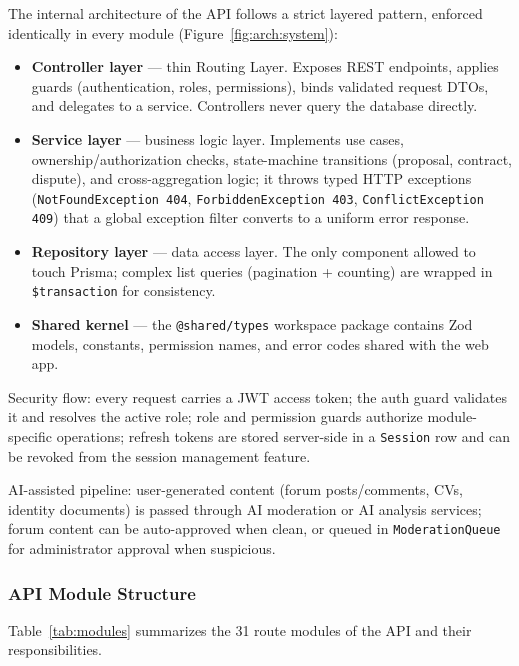 The internal architecture of the API follows a strict layered pattern, enforced identically in every module (Figure~\ref{fig:arch:system}):

\begin{itemize}[leftmargin=*]
    \item \textbf{Controller layer} --- thin Routing Layer. Exposes REST endpoints, applies guards (authentication, roles, permissions), binds validated request DTOs, and delegates to a service. Controllers never query the database directly.
    \item \textbf{Service layer} --- business logic layer. Implements use cases, ownership/authorization checks, state-machine transitions (proposal, contract, dispute), and cross-aggregation logic; it throws typed HTTP exceptions (\texttt{NotFoundException 404}, \texttt{ForbiddenException 403}, \texttt{ConflictException 409}) that a global exception filter converts to a uniform error response.
    \item \textbf{Repository layer} --- data access layer. The only component allowed to touch Prisma; complex list queries (pagination + counting) are wrapped in \texttt{\$transaction} for consistency.
    \item \textbf{Shared kernel} --- the \texttt{@shared/types} workspace package contains Zod models, constants, permission names, and error codes shared with the web app.
\end{itemize}

Security flow: every request carries a JWT access token; the auth guard validates it and resolves the active role; role and permission guards authorize module-specific operations; refresh tokens are stored server-side in a \texttt{Session} row and can be revoked from the session management feature.

AI-assisted pipeline: user-generated content (forum posts/comments, CVs, identity documents) is passed through AI moderation or AI analysis services; forum content can be auto-approved when clean, or queued in \texttt{ModerationQueue} for administrator approval when suspicious.

\subsubsection{API Module Structure}

Table~\ref{tab:modules} summarizes the 31 route modules of the API and their responsibilities.

